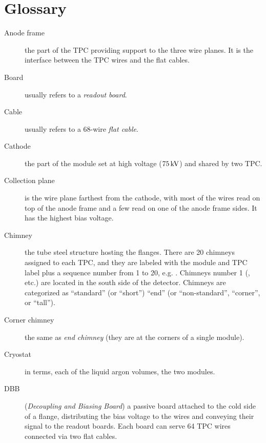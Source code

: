 \section{Glossary}
\label{sec:glossary}

\begin{description}

  \item[Anode frame]
    the part of the TPC providing support to the three wire
    planes. It is the interface between the TPC wires and the flat cables.

  \item[Board]
    usually refers to a \emph{readout board}.

  \item[Cable]
    usually refers to a 68-wire \emph{flat cable}.

  \item[Cathode]
    the part of the module set at high voltage ($75\,\textnormal{kV}$)
    and shared by two TPC.

  \item[Collection plane]
    is the wire plane farthest from the cathode,
    with most of the wires read on top of the anode frame and a few read on one
    of the anode frame sides. It has the highest bias voltage.

  \item[Chimney]
    the tube steel structure hosting the flanges. There are 20 chimneys assigned
    to each TPC, and they are labeled with the module and TPC label plus a
    sequence number from 1 to 20, e.g. . Chimneys number 1
    (,  etc.) are located in the south side of the
    detector. Chimneys are categorized as ``standard'' (or ``short'')
    ``end'' (or ``non-standard'', ``corner'', or ``tall'').

  \item[Corner chimney]
    the same as \emph{end chimney} (they are at the corners of a single module).

  \item[Cryostat]
    in \LArSoft terms, each of the liquid argon volumes, \ie the
    two modules.

  \item[DBB] (\emph{Decoupling and Biasing Board})
    a passive board attached
    to the cold side of a flange, distributing the bias voltage to the wires
    and conveying their signal to the readout boards. Each board can serve
    64 TPC wires connected via two flat cables.


\end{description}
